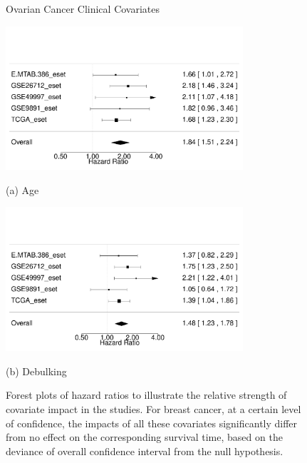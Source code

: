 \documentclass{article}
\begin{document}
  \begin{figure}[H]
      \centering
      \centerline{Ovarian Cancer Clinical Covariates}
        \begin{minipage}[b]{0.5\textwidth}
            \includegraphics[width=8.8cm]{forest_ovarian_age.pdf}
            \centerline{(a) Age}
        \end{minipage}%
        \begin{minipage}[b]{0.5\textwidth}
            \includegraphics[width=8.8cm]{forest_ovarian_debulk.pdf}
             \centerline{(b) Debulking}
        \end{minipage}
    \caption{Forest plots of hazard ratios to illustrate the relative strength of covariate impact in the studies. For breast cancer, at a certain level of confidence, the impacts of all these covariates significantly differ from no effect on the corresponding survival time, based on the deviance of overall confidence interval from the null hypothesis. %
}
\end{figure}
\end{document}
